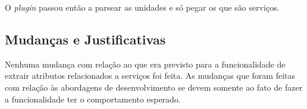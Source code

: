 O \textit{plugin} passou então a parsear as unidades e só pegar os que são serviços.

\subsection{Mudanças e Justificativas}
Nenhuma mudança com relação ao que era previsto para a funcionalidade de extrair
atributos relacionados a serviços foi feita. As mudanças que foram feitas com relação
às abordagens de desenvolvimento se devem somente ao fato de fazer a
funcionalidade ter o comportamento esperado.
